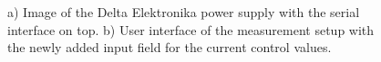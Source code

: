\begin{figure}[ht]
    \centering
    \hfill
    \caption{a) Image of the Delta Elektronika power supply with the serial interface on top. b) User interface of the measurement setup with the newly added input field for the current control values. }
    \label{fig:auto}
\end{figure}
